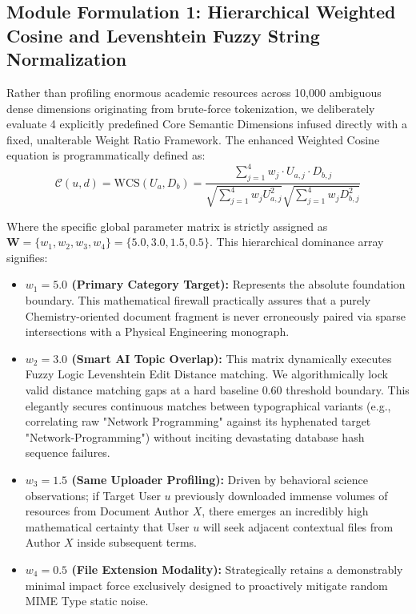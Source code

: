 \documentclass[journal]{IEEEtran}
\begin{document}
\subsection{Module Formulation 1: Hierarchical Weighted Cosine and Levenshtein Fuzzy String Normalization}

Rather than profiling enormous academic resources across 10,000 ambiguous dense dimensions originating from brute-force tokenization, 
we deliberately evaluate 4 explicitly predefined Core Semantic Dimensions infused directly with a fixed, unalterable Weight Ratio Framework. 
The enhanced Weighted Cosine equation is programmatically defined as:
\begin{equation}
\label{eq:wcs_engine}
\mathcal{C}(u,d) = \text{WCS}(U_a, D_b) = \frac{\sum_{j=1}^{4} w_j \cdot U_{a,j} \cdot D_{b,j}}{\sqrt{\sum_{j=1}^{4} w_j U_{a,j}^2} \sqrt{\sum_{j=1}^{4} w_j D_{b,j}^2}}
\end{equation}

Where the specific global parameter matrix is strictly assigned as $\mathbf{W} = \{w_1, w_2, w_3, w_4\} = \{5.0, 3.0, 1.5, 0.5\}$.
This hierarchical dominance array signifies:
\begin{itemize}
    \item \textbf{$w_1 = 5.0$ (Primary Category Target):} Represents the absolute foundation boundary. This mathematical firewall practically assures that a purely Chemistry-oriented document fragment is never erroneously paired via sparse intersections with a Physical Engineering monograph.
    \item \textbf{$w_2 = 3.0$ (Smart AI Topic Overlap):} This matrix dynamically executes Fuzzy Logic Levenshtein Edit Distance matching. We algorithmically lock valid distance matching gaps at a hard baseline $0.60$ threshold boundary. This elegantly secures continuous matches between typographical variants (e.g., correlating raw "Network Programming" against its hyphenated target "Network-Programming") without inciting devastating database hash sequence failures.
    \item \textbf{$w_3 = 1.5$ (Same Uploader Profiling):} Driven by behavioral science observations; if Target User $u$ previously downloaded immense volumes of resources from Document Author $X$, there emerges an incredibly high mathematical certainty that User $u$ will seek adjacent contextual files from Author $X$ inside subsequent terms.
    \item \textbf{$w_4 = 0.5$ (File Extension Modality):} Strategically retains a demonstrably minimal impact force exclusively designed to proactively mitigate random MIME Type static noise.
\end{itemize}
\end{document}
